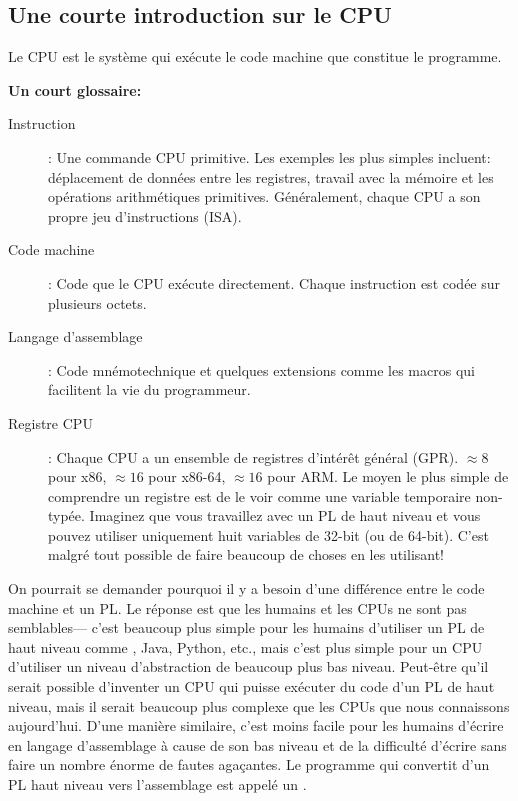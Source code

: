 \subsection{Une courte introduction sur le CPU}

Le \ac{CPU} est le système qui exécute le code machine que constitue le programme.

\textbf{Un court glossaire:}

\begin{description}
\item[Instruction]: Une commande \ac{CPU} primitive.
Les exemples les plus simples incluent: déplacement de données entre les registres, travail avec la mémoire et les opérations arithmétiques primitives.
Généralement, chaque \ac{CPU} a son propre jeu d'instructions (\ac{ISA}).

\item[Code machine]: Code que le \ac{CPU} exécute directement. 
Chaque instruction est codée sur plusieurs octets.
\item[Langage d'assemblage]: Code mnémotechnique et quelques extensions comme les macros qui facilitent la vie du programmeur.
\item[Registre CPU]: Chaque \ac{CPU} a un ensemble de registres d'intérêt général (\ac{GPR}).
$\approx 8$ pour x86, $\approx 16$ pour x86-64, $\approx 16$ pour ARM.
Le moyen le plus simple de comprendre un registre est de le voir comme une variable temporaire non-typée.
Imaginez que vous travaillez avec un \ac{PL} de haut niveau et vous pouvez utiliser uniquement huit variables de 32-bit (ou de 64-bit).
C'est malgré tout possible de faire beaucoup de choses en les utilisant!
\end{description}


On pourrait se demander pourquoi il y a besoin d'une différence entre le code machine et un \ac{PL}. Le réponse est que les humains et les \ac{CPU}s ne sont pas semblables---%
c'est beaucoup plus simple pour les humains d'utiliser un \ac{PL} de haut niveau comme \CCpp, Java, Python, etc., mais c'est plus simple pour un \ac{CPU} d'utiliser un niveau d'abstraction de beaucoup plus bas niveau.
Peut-être qu'il serait possible d'inventer un \ac{CPU} qui puisse exécuter du code d'un \ac{PL} de haut niveau, mais il serait beaucoup plus complexe que les \ac{CPU}s que nous connaissons aujourd'hui.
D'une manière similaire, c'est moins facile pour les humains d'écrire en langage d'assemblage à cause de son bas niveau et de la difficulté d'écrire sans faire un nombre énorme de fautes agaçantes.
Le programme qui convertit d'un \ac{PL} haut niveau vers l'assemblage est appelé un .

